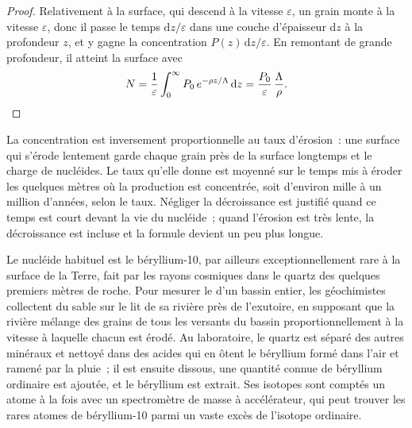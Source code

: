 \begin{proof}
Relativement à la surface, qui descend à la vitesse $\varepsilon$, un grain
monte à la vitesse $\varepsilon$, donc il passe le temps $\mathrm dz/\varepsilon$
dans une couche d'épaisseur $\mathrm dz$ à la profondeur $z$, et y gagne la
concentration $P(z)\,\mathrm dz/\varepsilon$. En remontant de grande profondeur, il
atteint la surface avec
\[
  N = \frac{1}{\varepsilon}\int_0^{\infty} P_0\,e^{-\rho z/\Lambda}\,\mathrm dz
  = \frac{P_0}{\varepsilon}\,\frac{\Lambda}{\rho}. \qedhere
\]
\end{proof}

La concentration est inversement proportionnelle au taux d'érosion~: une surface qui
s'érode lentement garde chaque grain près de la surface longtemps et le charge
de nucléides. Le taux qu'elle donne est moyenné sur le temps mis à éroder les
quelques mètres où la production est concentrée, soit d'environ
mille à un million d'années, selon le taux. Négliger la décroissance est
justifié quand ce temps est court devant la vie du nucléide~; quand
l'érosion est très lente, la décroissance est incluse et la formule devient un peu
plus longue.

\begin{inthelab}
Le nucléide habituel est le béryllium-10, par ailleurs exceptionnellement rare à la
surface de la Terre, fait par les rayons cosmiques dans le quartz des quelques premiers mètres
de roche. Pour mesurer
le  d'un bassin entier, les géochimistes collectent du sable sur le lit de
sa rivière près de l'exutoire, en supposant que la rivière mélange des grains de
tous les versants du bassin proportionnellement à la vitesse à laquelle chacun est érodé. Au
laboratoire, le quartz est séparé des autres minéraux et nettoyé dans des
acides qui en ôtent le béryllium formé dans l'air et ramené par la pluie~; il est ensuite
dissous, une quantité connue de béryllium ordinaire est ajoutée, et le béryllium
est extrait. Ses isotopes sont comptés un atome à la fois avec un spectromètre de
masse à accélérateur, qui peut trouver les rares atomes de béryllium-10 parmi un vaste
excès de l'isotope ordinaire.
\end{inthelab}

